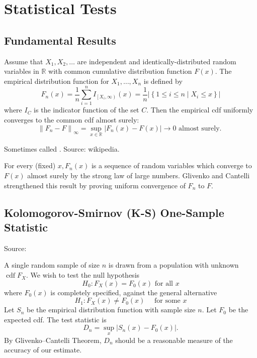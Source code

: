 \section{Statistical Tests}
\subsection{Fundamental Results}
\begin{theorem}
	Assume that $X_1, X_2, \ldots$ are independent and identically-distributed random variables in $\mathbb{R}$ with common cumulative distribution function $F(x)$. The empirical distribution function for $X_1, \ldots, X_n$ is defined by
\[
F_n(x)=\frac{1}{n} \sum_{i=1}^n I_{\left[X_i, \infty\right)}(x)=\frac{1}{n}\left|\left\{1 \leq i \leq n \mid X_i \leq x\right\}\right|
\]
where $I_C$ is the indicator function of the set $C$. Then the empirical cdf uniformly converges to the common cdf almost surely:
\[
\left\|F_n-F\right\|_{\infty}=\sup _{x \in \mathbb{R}}\left|F_n(x)-F(x)\right| \longrightarrow 0 \text { almost surely. }
\]
	
	Sometimes called . Source: wikipedia.
\end{theorem}
\begin{remark}
For every (fixed) $x, F_n(x)$ is a sequence of random variables which converge to $F(x)$ almost surely by the strong law of large numbers. Glivenko and Cantelli strengthened this result by proving uniform convergence of $F_n$ to $F$.
\end{remark}

\subsection{Kolomogorov-Smirnov (K-S) One-Sample Statistic}
Source: \cite{gibbonsNonparametricStatisticalInference2014}

A single random sample of size $n$ is drawn from a population with unknown $\operatorname{cdf} F_X$. We wish to test the null hypothesis
\[
H_0: F_X(x)=F_0(x) \text { for all } x
\]
where $F_0(x)$ is completely specified, against the general alternative
\[
H_1: F_X(x) \neq F_0(x) \quad \text { for some } x
\]
Let $S_n$ be the empirical distribution function with sample size $n$. Let $F_0$ be the expected cdf.
The test statistic is
\[
D_n=\sup _x\left|S_n(x)-F_0(x)\right|
.\]
By Glivenko–Cantelli Theorem, $D_n$ should be a reasonable measure of the accuracy of our estimate.

